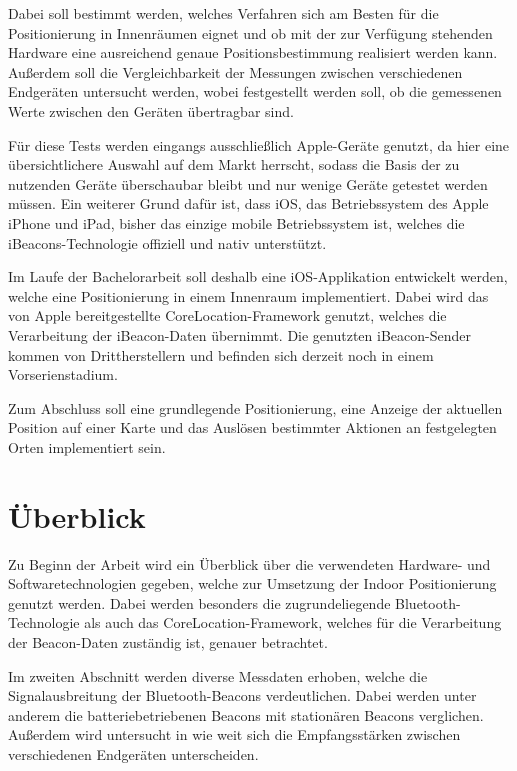 Dabei soll bestimmt werden, welches Verfahren sich am Besten für die Positionierung in Innenräumen eignet und ob mit der zur Verfügung stehenden Hardware eine ausreichend genaue Positionsbestimmung realisiert werden kann. Außerdem soll die Vergleichbarkeit der Messungen zwischen verschiedenen Endgeräten untersucht werden, wobei festgestellt werden soll, ob die gemessenen Werte zwischen den Geräten übertragbar sind.

Für diese Tests werden eingangs ausschließlich Apple-Geräte genutzt, da hier eine übersichtlichere Auswahl auf dem Markt herrscht, sodass die Basis der zu nutzenden Geräte überschaubar bleibt und nur wenige Geräte getestet werden müssen. Ein weiterer Grund dafür ist, dass iOS, das Betriebssystem des Apple iPhone und iPad, bisher das einzige mobile Betriebssystem ist, welches die iBeacons-Technologie offiziell und nativ unterstützt.

Im Laufe der Bachelorarbeit soll deshalb eine iOS-Applikation entwickelt werden, welche eine Positionierung in einem Innenraum implementiert. Dabei wird das von Apple bereitgestellte CoreLocation-Framework genutzt, welches die Verarbeitung der iBeacon-Daten übernimmt. Die genutzten iBeacon-Sender kommen von Drittherstellern und befinden sich derzeit noch in einem Vorserienstadium. 

Zum Abschluss soll eine grundlegende Positionierung, eine Anzeige der aktuellen Position auf einer Karte und das Auslösen bestimmter Aktionen an festgelegten Orten implementiert sein.


\section{Überblick}
\label{sec:introduction:overview}
Zu Beginn der Arbeit wird ein Überblick über die verwendeten Hardware- und Softwaretechnologien gegeben, welche zur Umsetzung der Indoor Positionierung genutzt werden. Dabei werden besonders die zugrundeliegende Bluetooth-Technologie als auch das CoreLocation-Framework, welches für die Verarbeitung der Beacon-Daten zuständig ist, genauer betrachtet. 

Im zweiten Abschnitt werden diverse Messdaten erhoben, welche die Signalausbreitung der Bluetooth-Beacons verdeutlichen. Dabei werden unter anderem die batteriebetriebenen Beacons mit stationären Beacons verglichen. Außerdem wird untersucht in wie weit sich die Empfangsstärken zwischen verschiedenen Endgeräten unterscheiden. 

